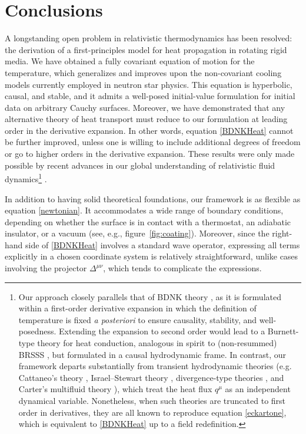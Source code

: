 \documentclass[a4paper, amsfonts, amssymb, amsmath, reprint, showkeys, nofootinbib, twoside, onecolumn,notitlepage]{revtex4-1}
\theoremstyle{definition}
\theoremstyle{theorem}
\begin{document}
\newpage
\section{Conclusions}

A longstanding open problem in relativistic thermodynamics has been resolved: the derivation of a first-principles model for heat propagation in rotating rigid media. We have obtained a fully covariant equation of motion for the temperature, which generalizes and improves upon the non-covariant cooling models currently employed in neutron star physics. This equation is hyperbolic, causal, and stable, and it admits a well-posed initial-value formulation for initial data on arbitrary Cauchy surfaces. Moreover, we have demonstrated that any alternative theory of heat transport must reduce to our formulation at leading order in the derivative expansion. In other words, equation \eqref{BDNKHeat} cannot be further improved, unless one is willing to include additional degrees of freedom or go to higher orders in the derivative expansion. These results were only made possible by recent advances in our global understanding of relativistic fluid dynamics\footnote{\color{black} Our approach closely parallels that of BDNK theory \cite{BemficaDNDefinitivo2020,Kovtun2019}, as it is formulated within a first-order derivative expansion in which the definition of temperature is fixed \textit{a posteriori} to ensure causality, stability, and well-posedness. Extending the expansion to second order would lead to a Burnett-type theory for heat conduction, analogous in spirit to (non-resummed) BRSSS \cite{Baier2008}, but formulated in a causal hydrodynamic frame. In contrast, our framework departs substantially from transient hydrodynamic theories (e.g. Cattaneo's theory \cite{cattaneo1958}, Israel–Stewart theory \cite{Israel_Stewart_1979,Hishcock1983,Denicol2012Boltzmann}, divergence-type theories \cite{Liu1986,GerochLindblom1990}, and Carter's multifluid theory \cite{lopez2011,carter1991,PriouCOMPAR1991}), which treat the heat flux $q^\mu$ as an independent dynamical variable. Nonetheless, when such theories are truncated to first order in derivatives, they are all known to reproduce equation \eqref{eckartone}, which is equivalent to \eqref{BDNKHeat} up to a field redefinition.} \cite{BemficaDNDefinitivo2020,Kovtun2019,GavassinoSuperlum2021,Basar:2024qxd,GavassinoParabolic2025hwz}.

In addition to having solid theoretical foundations, our framework is as flexible as equation \eqref{newtonian}. It accommodates a wide range of boundary conditions, depending on whether the surface is in contact with a thermostat, an adiabatic insulator, or a vacuum (see, e.g., figure~\ref{fig:coating}). Moreover, since the right-hand side of \eqref{BDNKHeat} involves a standard wave operator, expressing all terms explicitly in a chosen coordinate system is relatively straightforward, unlike cases involving the projector $\Delta^{\mu \nu}$, which tends to complicate the expressions. 
\end{document}
